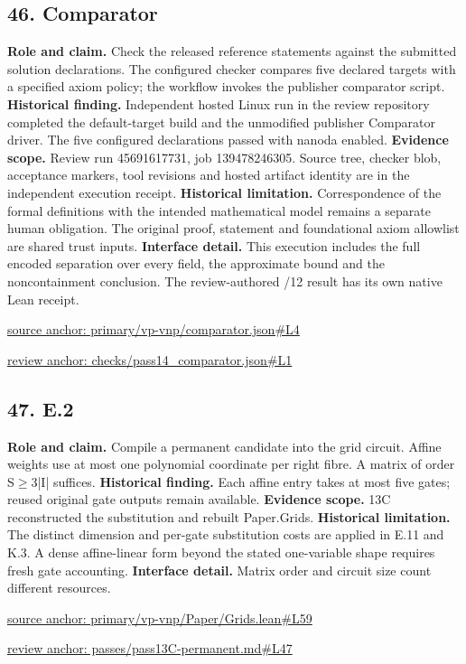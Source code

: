 \documentclass[11pt,letterpaper]{article}
\theoremstyle{definition}\newtheorem{definition}[theorem]{Definition}\newtheorem{example}[theorem]{Example}
\theoremstyle{remark}\newtheorem{remark}[theorem]{Remark}
\begin{document}
\subsection*{46. Comparator}
\textbf{Role and claim.} Check the released reference statements against the submitted solution declarations. The configured checker compares five declared targets with a specified axiom policy; the workflow invokes the publisher comparator script.
\textbf{Historical finding.} Independent hosted Linux run in the review repository completed the default-target build and the unmodified publisher Comparator driver. The five configured declarations passed with nanoda enabled.
\textbf{Evidence scope.} Review run 45691617731, job 139478246305. Source tree, checker blob, acceptance markers, tool revisions and hosted artifact identity are in the independent execution receipt.
\textbf{Historical limitation.} Correspondence of the formal definitions with the intended mathematical model remains a separate human obligation. The original proof, statement and foundational axiom allowlist are shared trust inputs.
\textbf{Interface detail.} This execution includes the full encoded separation over every field, the approximate bound and the noncontainment conclusion. The review-authored /12 result has its own native Lean receipt.
\par\href{https://github.com/nousentllc/VP-VNP-Review/blob/8a7976933b6b2b4ffda1ad3a0dfb5fc6b6f023e8/primary/vp-vnp/comparator.json\#L4}{source anchor: primary/vp-vnp/comparator.json\#L4}
\par\href{https://github.com/nousentllc/VP-VNP-Review/blob/8a7976933b6b2b4ffda1ad3a0dfb5fc6b6f023e8/checks/pass14_comparator.json\#L1}{review anchor: checks/pass14\_comparator.json\#L1}
\goodbreak
{}
\hypertarget{claim.47}{}
\subsection*{47. E.2}
\textbf{Role and claim.} Compile a permanent candidate into the grid circuit. Affine weights use at most one polynomial coordinate per right fibre. A matrix of order S\ensuremath{\ge}3|I| suffices.
\textbf{Historical finding.} Each affine entry takes at most five gates; reused original gate outputs remain available.
\textbf{Evidence scope.} 13C reconstructed the substitution and rebuilt Paper.Grids.
\textbf{Historical limitation.} The distinct dimension and per-gate substitution costs are applied in E.11 and K.3. A dense affine-linear form beyond the stated one-variable shape requires fresh gate accounting.
\textbf{Interface detail.} Matrix order and circuit size count different resources.
\par\href{https://github.com/nousentllc/VP-VNP-Review/blob/8a7976933b6b2b4ffda1ad3a0dfb5fc6b6f023e8/primary/vp-vnp/Paper/Grids.lean\#L59}{source anchor: primary/vp-vnp/Paper/Grids.lean\#L59}
\par\href{https://github.com/nousentllc/VP-VNP-Review/blob/8a7976933b6b2b4ffda1ad3a0dfb5fc6b6f023e8/passes/pass13C-permanent.md\#L47}{review anchor: passes/pass13C-permanent.md\#L47}
\goodbreak
{}
\hypertarget{claim.48}{}
\end{document}
